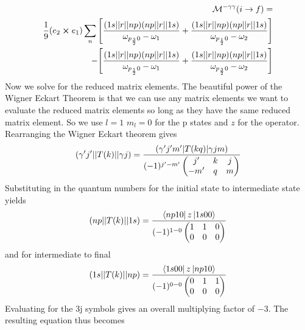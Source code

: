 \begin{equation}
\begin{split}
    \mathcal{M}^{-\gamma\gamma}(i\rightarrow f)=\\
    \frac{1}{9}(e_2\cross e_1)
    \sum_{n}
    \Bigg[
    \frac{
    (1s\abs{\abs{r}}np)(np\abs{\abs{r}}1s)}     {\omega_{p_{\frac{3}{2}}0}-\omega_{1}}
    +
    \frac{
    (1s\abs{\abs{r}}np)(np\abs{\abs{r}}1s) }    {\omega_{p_{\frac{1}{2}}0}-\omega_{2}}
    \Bigg]\\
    -
    \Bigg[
    \frac{
    (1s\abs{\abs{r}}np)(np\abs{\abs{r}}1s) }    {\omega_{p_{\frac{1}{2}}0}-\omega_{1}}
    +
    \frac{
    (1s\abs{\abs{r}}np)(np\abs{\abs{r}}1s) }    {\omega_{p_{\frac{3}{2}}0}-\omega_{2}}
    \Bigg]
    \end{split}
\end{equation}
Now we solve for the reduced matrix elements. The beautiful power of the Wigner Eckart Theorem is that we can use any matrix elements we want to evaluate the reduced matrix elements so long as they have the same reduced matrix element. So we use \(l=1\) \(m_l=0\) for the p states and \(z\) for the operator. Rearranging the Wigner Eckart theorem gives
\begin{equation}
    (\gamma'j'\abs{\abs{T(k)}}\gamma j)=
    \frac{(\gamma'j'm'\abs{T(kq)}\gamma j m)}
    {
    (-1)^{j'-m'}
    \begin{pmatrix}
    j'  &k  &j\\
    -m' &q  &m
    \end{pmatrix}
    }
\end{equation}
Substituting in the quantum numbers for the initial state to intermediate state yields
\begin{equation}
    (np\abs{\abs{T(k)}}1s)=
    \frac{\bra{np10}z\ket{1s 0 0}}
    {
    (-1)^{1-0}
    \begin{pmatrix}
    1   &1  &0\\
    0   &0  &0
    \end{pmatrix}
    }
\end{equation}
and for intermediate to final
\begin{equation}
    (1s\abs{\abs{T(k)}}np)=
    \frac{\bra{1s00}z\ket{np 1 0}}
    {
    (-1)^{0-0}
    \begin{pmatrix}
    0   &1  &1\\
    0   &0  &0
    \end{pmatrix}
    }
\end{equation}
Evaluating for the 3j symbols gives an overall multiplying factor of \(-3\). The resulting equation thus becomes
